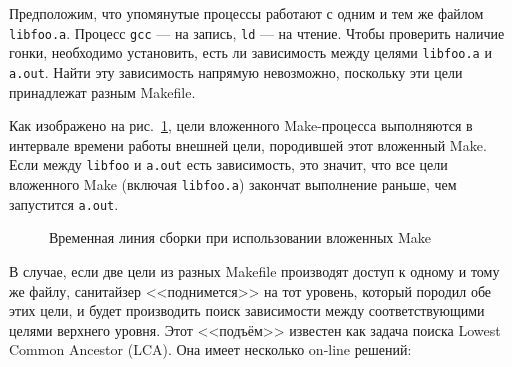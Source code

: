 Предположим, что упомянутые процессы работают с одним и тем же файлом \texttt{libfoo.a}. Процесс \texttt{gcc} --- на запись, \texttt{ld} --- на чтение. Чтобы проверить наличие гонки, необходимо установить, есть ли зависимость между целями \texttt{libfoo.a} и \texttt{a.out}. Найти эту зависимость напрямую невозможно, поскольку эти цели принадлежат разным Makefile.

Как изображено на рис.~\ref{fig:nested-make-timeline}, цели вложенного Make-процесса выполняются в интервале времени работы внешней цели, породившей этот вложенный Make. Если между \texttt{libfoo} и \texttt{a.out} есть зависимость, это значит, что все цели вложенного Make (включая \texttt{libfoo.a}) закончат выполнение раньше, чем запустится \texttt{a.out}.

\begin{figure}[H]
    \centering

    \caption{Временная линия сборки при использовании вложенных Make}
    \label{fig:nested-make-timeline}
\end{figure}

В случае, если две цели из разных Makefile производят доступ к одному и тому же файлу, санитайзер <<поднимется>> на тот уровень, который породил обе этих цели, и будет производить поиск зависимости между соответствующими целями верхнего уровня. Этот <<подъём>> известен как задача поиска Lowest Common Ancestor (LCA). Она имеет несколько on-line решений:

